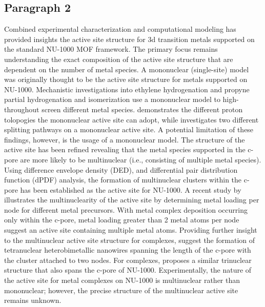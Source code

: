 \documentclass[journal=jctcce,manuscript=article]{achemso}
\begin{document}
\subsection{Paragraph 2}
Combined experimental characterization and computational modeling has provided insights the active site structure for 3d transition metals supported on the standard NU-1000 MOF framework. The primary focus remains understanding the exact composition of the active site structure that are dependent on the number of metal species. A mononuclear (single-site) model was originally thought to be the active site structure for metals supported on NU-1000.\cite{Li2016sintering,AbdelMageed2019,Gallington2016} Mechanistic investigations into ethylene hydrogenation\cite{Shabbir2020} and propyne partial hydrogenation and isomerization\cite{Hackler2020} use a mononuclear model to high-throughout screen different metal species. \citeauthor{Shabbir2020} demonstrates the different proton tolopogies the mononuclear active site can adopt,\cite{Shabbir2020} while \citeauthor{Hackler2020} investigates two different  splitting pathways on a mononuclear active site.\cite{Hackler2020} A potential limitation of these findings, however, is the usage of a mononuclear model. The structure of the active site has been refined revealing that the metal species supported in the c-pore are more likely to be multinuclear (i.e., consisting of multiple metal species). Using difference envelope density (DED),\cite{Li2017} and differential pair distribution function (dPDF) analysis,\cite{PlateroPrats2017} the formation of multinuclear clusters within the c-pore has been established as the active site for NU-1000. A recent study by \citeauthor{Kim2020}  illustrates the multinuclearity of the active site by determining metal loading per node for different metal precursors.\cite{Kim2020} With metal complex deposition occurring only within the c-pore, metal loading greater than 2 metal atoms per node suggest an active site containing multiple metal atoms. Providing further insight to the multinuclear active site structure for  complexes, \citeauthor{PlateroPrats2017} suggest the formation of tetranuclear heterobimetallic nanowires spanning the length of the c-pore with the cluster attached to two nodes.\citeauthor{PlateroPrats2017} For  complexes, \citeauthor{Ikuno2017} proposes a similar trinuclear structure that also spans the c-pore of NU-1000. Experimentally, the nature of the active site for metal complexes on NU-1000 is multinuclear rather than mononuclear; however, the precise structure of the multinuclear active site remains unknown. 
\end{document}
